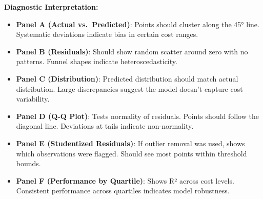\textbf{Diagnostic Interpretation:}
\begin{itemize}
    \item \textbf{Panel A (Actual vs.\ Predicted)}: Points should cluster along the 45° line. Systematic deviations indicate bias in certain cost ranges.
    \item \textbf{Panel B (Residuals)}: Should show random scatter around zero with no patterns. Funnel shapes indicate heteroscedasticity.
    \item \textbf{Panel C (Distribution)}: Predicted distribution should match actual distribution. Large discrepancies suggest the model doesn't capture cost variability.
    \item \textbf{Panel D (Q-Q Plot)}: Tests normality of residuals. Points should follow the diagonal line. Deviations at tails indicate non-normality.
    \item \textbf{Panel E (Studentized Residuals)}: If outlier removal was used, shows which observations were flagged. Should see most points within threshold bounds.
    \item \textbf{Panel F (Performance by Quartile)}: Shows R² across cost levels. Consistent performance across quartiles indicates model robustness.
\end{itemize}

